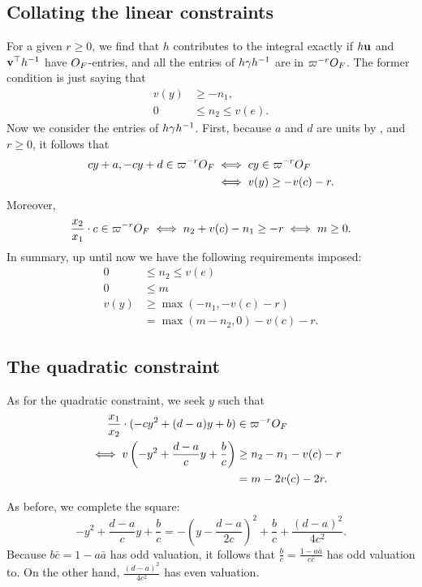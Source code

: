 \subsection{Collating the linear constraints}
For a given $r \ge 0$, we find that $h$ contributes to the integral exactly
if $h\mathbf u$ and $\mathbf v^\top h^{-1}$ have $O_F$-entries,
and all the entries of $h \gamma h^{-1}$ are in $\varpi^{-r}O_F$.
The former condition is just saying that
\begin{align*}
  v(y) &\ge -n_1, \\
  0 &\le n_2 \le v(e).
\end{align*}
Now we consider the entries of $h\gamma h^{-1}$.
First, because $a$ and $d$ are units by ,
and $r \ge 0$, it follows that
\begin{align*}
  cy + a, -cy + d \in \varpi^{-r}O_F
  &\iff cy \in \varpi^{-r}O_F \\
  &\iff v(y) \ge -v(c) - r.
\end{align*}
Moreover,
\[ \frac{x_2}{x_1} \cdot c \in \varpi^{-r} O_F
  \iff n_2 + v(c) -n_1 \ge - r \iff m \ge 0. \]
In summary, up until now we have the following requirements imposed:
\begin{equation}
  \begin{aligned}
  0 &\le n_2 \le v(e) \\
  0 &\le m \\
  v(y) &\ge \max(-n_1, -v(c) - r) \\
  &= \max(m-n_2, 0) - v(c) - r.
  \end{aligned}
  \label{eq:linear_constraints}
\end{equation}

\subsection{The quadratic constraint}
As for the quadratic constraint, we seek $y$ such that
\begin{align*}
  \phantom\iff \frac{x_1}{x_2} \cdot (-cy^2+(d-a)y+b) &\in \varpi^{-r} \OO_F \\
  \iff v\left(-y^2+ \frac{d-a}{c} y + \frac bc \right) &\ge n_2 - n_1 - v(c) - r \\
  &= m - 2v(c) - 2r.
\end{align*}

As before, we complete the square:
\[
  -y^2+ \frac{d-a}{c} y + \frac bc
  = -\left( y - \frac{d-a}{2c} \right)^2 + \frac bc + \frac{(d-a)^2}{4c^2}.
\]
Because $b \bar c = 1 - a \bar a$ has odd valuation,
it follows that $\frac b c = \frac{1-a \bar a}{c\bar c}$ has odd valuation to.
On the other hand, $\frac{(d-a)^2}{4c^2}$ has even valuation.

